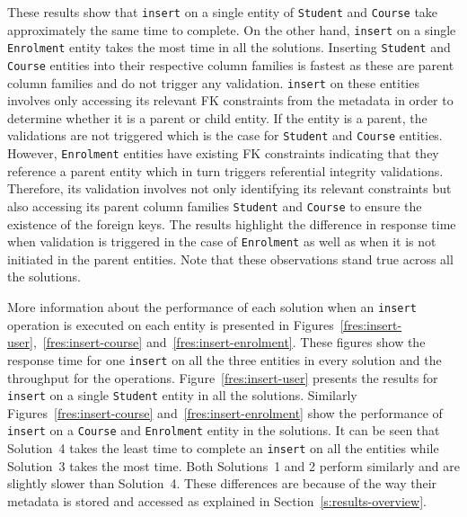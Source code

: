 These results show
that \texttt{insert} on a single entity of \texttt{Student} and \texttt{Course}
take approximately the same time to complete. On the other hand, \texttt{insert}
on a single \texttt{Enrolment} entity takes the most time in all the solutions.
Inserting \texttt{Student} and \texttt{Course} entities into their respective
column families is fastest as these are parent column families and do not
trigger any validation. \texttt{insert} on these entities involves only
accessing its relevant \ac{FK} constraints from the metadata in order to
determine whether it is a parent or child entity. If the entity is a parent, the
validations are not triggered which is the case for \texttt{Student} and
\texttt{Course} entities. However, \texttt{Enrolment} entities have existing
\ac{FK} constraints indicating that they reference a parent entity which in turn
triggers referential integrity validations. Therefore,  its
validation involves not only identifying its relevant constraints but also
accessing its parent column families \texttt{Student} and \texttt{Course} to
ensure the existence of the foreign keys.
The results highlight the difference in response time when validation is
triggered in the case of \texttt{Enrolment} as well as when it is not initiated
in the parent entities.
Note that these observations stand true across all the solutions.

More information about the performance of each solution when an \texttt{insert}
operation is executed on each entity is presented in
Figures~\ref{fres:insert-user},~\ref{fres:insert-course}
and~\ref{fres:insert-enrolment}.
These figures show the response time for one \texttt{insert}
on all the three entities in every solution and the throughput for the
operations.
Figure~\ref{fres:insert-user} presents the results for \texttt{insert} on a
single \texttt{Student} entity in all the solutions. Similarly
Figures~\ref{fres:insert-course} and~\ref{fres:insert-enrolment} show the
performance of \texttt{insert} on a \texttt{Course} and \texttt{Enrolment}
entity in the solutions. It can be seen that Solution~4 takes the least time to
complete an \texttt{insert} on all the entities while Solution~3 takes the most
time. Both Solutions~1 and 2 perform similarly and are slightly slower than
Solution~4. These differences are because of the way their metadata is stored
and accessed as explained in Section~\ref{s:results-overview}.

